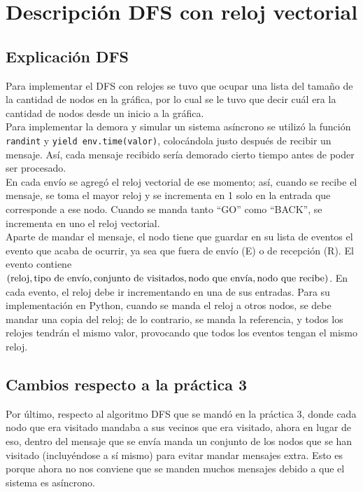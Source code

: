 

\section{Descripción DFS con reloj vectorial}


\subsection{Explicación DFS}

Para implementar el DFS con relojes se tuvo que ocupar una lista del tamaño de la cantidad de nodos en la gráfica, por lo cual se le tuvo que decir cuál era la cantidad de nodos desde un inicio a la gráfica.\\

Para implementar la demora y simular un sistema asíncrono se utilizó la función \texttt{randint} y \texttt{yield env.time(valor)}, colocándola justo después de recibir un mensaje. Así, cada mensaje recibido sería demorado cierto tiempo antes de poder ser procesado.\\

En cada envío se agregó el reloj vectorial de ese momento; así, cuando se recibe el mensaje, se toma el mayor reloj y se incrementa en 1 solo en la entrada que corresponde a ese nodo. Cuando se manda tanto “GO” como “BACK”, se incrementa en uno el reloj vectorial.\\

Aparte de mandar el mensaje, el nodo tiene que guardar en su lista de eventos el evento que acaba de ocurrir, ya sea que fuera de envío (E) o de recepción (R). El evento contiene $(\text{reloj}, \text{tipo de envío},  \text{conjunto de visitados}, \\ \text{nodo que envía}, \text{nodo que recibe})$. En cada evento, el reloj debe ir incrementando en una de sus entradas. Para su implementación en Python, cuando se manda el reloj a otros nodos, se debe mandar una copia del reloj; de lo contrario, se manda la referencia, y todos los relojes tendrán el mismo valor, provocando que todos los eventos tengan el mismo reloj.\\

\subsection{Cambios respecto a la práctica 3}

Por último, respecto al algoritmo DFS que se mandó en la práctica 3, donde cada nodo que era visitado mandaba a sus vecinos que era visitado, ahora en lugar de eso, dentro del mensaje que se envía manda un conjunto de los nodos que se han visitado (incluyéndose a sí mismo) para evitar mandar mensajes extra. Esto es porque ahora no nos conviene que se manden muchos mensajes debido a que el sistema es asíncrono.\\


